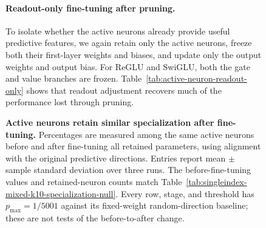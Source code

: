 \documentclass{article}
\begin{document}
\begin{figure}
\begin{table}[H]
    \centering
    \small
    \renewcommand{\arraystretch}{1.15}
    \setlength{\tabcolsep}{5pt}
    \caption{\textbf{Active neurons retain similar specialization after fine-tuning.}
    Percentages are measured among the same active neurons before and after
    fine-tuning all retained parameters, using alignment with the original predictive directions.
    Entries report mean \(\pm\) sample standard deviation over three runs.
    The before-fine-tuning values and retained-neuron counts match
    Table~\ref{tab:singleindex-mixed-k10-specialization-null}.
    Every row, stage, and threshold has \(p_{\max}=1/5001\) against its
    fixed-weight random-direction baseline; these are not tests of the
    before-to-after change.}
    \label{tab:importance-pruning-alignment}
\end{table}

\paragraph{Readout-only fine-tuning after pruning.}
To isolate whether the active neurons already provide useful predictive
features, we again retain only the active neurons, freeze both their first-layer
weights and biases, and update only the output weights and output bias.
For ReGLU and SwiGLU, both the gate and value branches are frozen.
Table~\ref{tab:active-neuron-readout-only} shows that readout adjustment
recovers much of the performance lost through pruning.


\end{figure}
\end{document}
